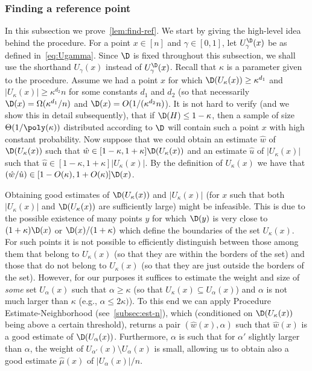 \subsubsection{Finding a reference point}\label{subsec:find-ref}
In this subsection we prove~\cref{lem:find-ref}.
We start by giving the high-level idea behind the procedure.
For a point $x\in [n]$ and $\gamma \in [0,1]$, let
$U^\D_\gamma(x)$ be as defined in~\cref{eq:Ugamma}.
Since $\D$ is fixed throughout this subsection, we shall use
the shorthand $U_\gamma(x)$ instead of $U^\D_\gamma(x)$.
Recall that $\kappa$ is a parameter given to the procedure.
Assume we had a point $x$ for which $\D(U_\kappa(x)) \geq \kappa^{d_1}$
and  $|U_\kappa(x)| \geq \kappa^{d_2}n $
for some constants $d_1$ and $d_2$
(so that necessarily $\D(x) = \Omega(\kappa^{d_1}/n)$ and
$\D(x) = O(1/(\kappa^{d_2}n)$).
It is not hard to verify (and we show this in detail subsequently),
that if  $\D(H) \leq 1-\kappa$, then a sample of size
$\Theta(1/\poly(\kappa))$ distributed according to $\D$
will contain such a point $x$
with high constant probability. Now suppose that we could obtain an estimate
$\hat{w}$ of $\D(U_\kappa(x))$ such that
$\hat{w} \in [1-\kappa,1+\kappa]\D(U_\kappa(x))$ and an estimate
$\hat{u}$ of $|U_\kappa(x)|$ such that
$\hat{u}\in [1-\kappa,1+\kappa]|U_\kappa(x)|$. By the definition of
$U_\kappa(x)$ we have that
$(\hat{w}/\hat{u})\in  [1-O(\kappa),1+O(\kappa)]\D(x)$.

Obtaining good estimates
of $\D(U_\kappa(x))$  and $|U_\kappa(x)|$ (for $x$ such that
both $|U_\kappa(x)|$ and $\D(U_\kappa(x))$ are sufficiently large)
might be infeasible. This is
due to the possible existence
of many points $y$ for which $\D(y)$ is very close
to $(1+\kappa)\D(x)$ or $\D(x)/(1+\kappa)$
which define the boundaries of the set $U_\kappa(x)$.
For such points it is not possible to efficiently
distinguish between those among them that belong
to $U_\kappa(x)$ (so that they are within the borders
of the set) and those that do not belong to
$U_\kappa(x)$ (so that they are just outside the borders
of the set).
However, for our purposes it suffices to estimate
the weight and size  of {\em some\/} set $U_\alpha(x)$
such that $\alpha \geq \kappa $ (so that $U_\kappa(x) \subseteq U_\alpha(x)$)
and $\alpha$ is not much larger than $\kappa $ (e.g., $\alpha \leq 2\kappa)$).
To this end we can apply Procedure {\sc Estimate-Neighborhood}
(see~\cref{subsec:est-n}), which (conditioned
on $\D(U_\kappa(x))$ being above a certain threshold),
returns a pair $(\hat{w}(x),\alpha)$
such that $\hat{w}(x)$ is a good estimate of $\D(U_\alpha(x))$.
Furthermore, $\alpha$ is such that for $\alpha'$ slightly larger
than $\alpha$, the weight of $U_{\alpha'}(x)\setminus U_\alpha(x)$
is small, allowing us to obtain also a good estimate $\hat{\mu}(x)$
of  $|U_\alpha(x)|/n$.

